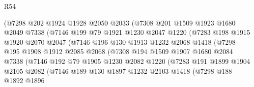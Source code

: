 \begin{lexlean}{R54}
\begin{coremodule}
                    (@7298
                      @202
                      @1924
                      @1928
                      @2050
                      @2033
                      (@7308
                        @201
                        @1509
                        @1923
                        @1680
                        @2049
                        @7338
                        (@7146
                          @199
                          @79
                          @1921
                          @1230
                          @2047
                          @1220
                          (@7283
                            @198
                            @1915
                            @1920
                            @2070
                            @2047
                            (@7146
                              @196
                              @130
                              @1913
                              @1232
                              @2068
                              @1418
                              (@7298
                                @195
                                @1908
                                @1912
                                @2085
                                @2068
                                (@7308
                                  @194
                                  @1509
                                  @1907
                                  @1680
                                  @2084
                                  @7338
                                  (@7146
                                    @192
                                    @79
                                    @1905
                                    @1230
                                    @2082
                                    @1220
                                    (@7283
                                      @191
                                      @1899
                                      @1904
                                      @2105
                                      @2082
                                      (@7146
                                        @189
                                        @130
                                        @1897
                                        @1232
                                        @2103
                                        @1418
                                        (@7298
                                          @188
                                          @1892
                                          @1896

\end{coremodule}
\end{lexlean}
